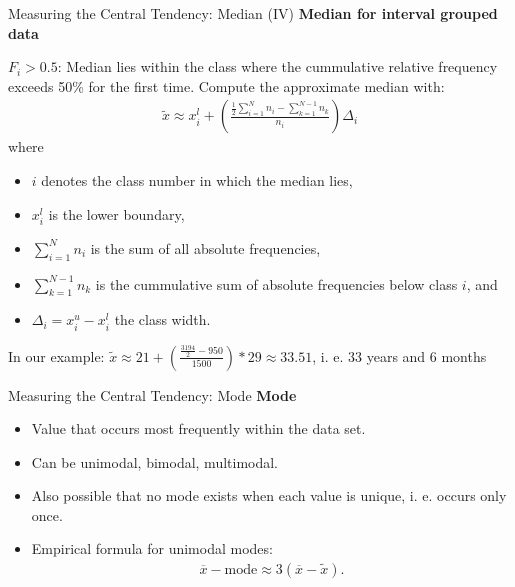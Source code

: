 \begin{frame}{Measuring the Central Tendency: Median (IV)}
  \textbf{Median for interval grouped data}

  $F_i>0.5$: Median lies within the class where the cummulative
  relative frequency exceeds 50\% for the first time. Compute the approximate median with:
  \begin{align*}
    \tilde{x} \approx x_i^l +\left(\frac{\frac{1}{2}\sum_{i=1}^{N}n_i - \sum_{k=1}^{N-1} n_k}{n_i}\right)\Delta_i
  \end{align*}
  where
  \begin{itemize}
  \item $i$ denotes the class number in which the median lies,
  \item $x_i^l$ is the lower boundary,
  \item $\sum_{i=1}^{N}n_i$ is the sum of all absolute frequencies,
  \item $\sum_{k=1}^{N-1} n_k$ is the cummulative sum of absolute frequencies below class $i$, and
  \item $\Delta_i=x_i^u - x_i^l$ the class width.
  \end{itemize}

  In our example: $\tilde{x} \approx 21 +\left(\frac{\frac{3194}{2} - 950}{1500}\right)*29 \approx 33.51$, i. e. 33 years and 6 months
\end{frame}

\begin{frame}{Measuring the Central Tendency: Mode}
  \textbf{Mode}
  \begin{itemize}
  \item Value that occurs most frequently within the data set.
  \item Can be unimodal, bimodal, multimodal.
  \item Also possible that no mode exists when each value is unique,
    i. e. occurs only once.
  \item Empirical formula for unimodal modes:
    \begin{align}
      \overline{x} - \text{mode} \approx 3(\overline{x}- \tilde{x}).
    \end{align}
  \end{itemize}
\end{frame}

